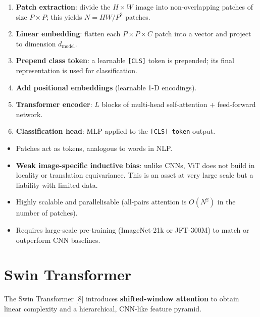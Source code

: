 \documentclass[12pt,a4paper]{report}
\begin{document}
\begin{enumerate}[itemsep=2pt]
    \item \textbf{Patch extraction}: divide the $H\times W$ image into
          non-overlapping patches of size $P\times P$; this yields
          $N = HW/P^2$ patches.
    \item \textbf{Linear embedding}: flatten each $P\times P\times C$ patch
          into a vector and project to dimension $d_\text{model}$.
    \item \textbf{Prepend class token}: a learnable \texttt{[CLS]} token is
          prepended; its final representation is used for classification.
    \item \textbf{Add positional embeddings} (learnable 1-D encodings).
    \item \textbf{Transformer encoder}: $L$ blocks of multi-head self-attention
          + feed-forward network.
    \item \textbf{Classification head}: MLP applied to the \texttt{[CLS]
          token} output.
\end{enumerate}

\begin{importantbox}
\begin{itemize}[itemsep=1pt]
    \item Patches act as tokens, analogous to words in NLP.
    \item \textbf{Weak image-specific inductive bias}: unlike CNNs, ViT does
          not build in locality or translation equivariance.  This is an asset
          at very large scale but a liability with limited data.
    \item Highly scalable and parallelisable (all-pairs attention is
          $O(N^2)$ in the number of patches).
    \item Requires large-scale pre-training (ImageNet-21k or JFT-300M) to
          match or outperform CNN baselines.
\end{itemize}
\end{importantbox}

\section{Swin Transformer}

The Swin Transformer [8] introduces \textbf{shifted-window
attention} to obtain linear complexity and a hierarchical, CNN-like feature
pyramid.
\end{document}
